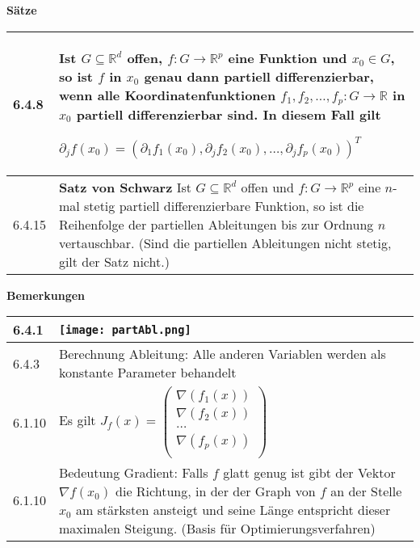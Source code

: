     \noindent 
    \textbf{Sätze}
    \begin{table}[H]
    \begin{tabularx}{\textwidth}{X m{16cm}}
        \toprule

        6.4.8 & Ist $G \subseteq \mathbb{R}^d$ offen, $f: G \rightarrow \mathbb{R}^p$ eine Funktion und $x_0 \in G$, so ist $f$ in $x_0$
                genau dann partiell differenzierbar, wenn alle Koordinatenfunktionen $f_1, f_2, \dots, f_p : G\rightarrow \mathbb{R}$ in $x_0$
                partiell differenzierbar sind. In diesem Fall gilt \hfill \break
                \centerline{$ \partial_j f(x_0) = (\partial_1 f_1(x_0), \partial_j f_2(x_0), \dots, \partial_j f_p(x_0) )^T$} \\
        \midrule
        6.4.15& \textbf{Satz von Schwarz} \hfill \break
                Ist $G \subseteq \mathbb{R}^d$ offen und $f: G \rightarrow \mathbb{R}^p$ eine $n$-mal stetig partiell differenzierbare Funktion,
                so ist die Reihenfolge der partiellen Ableitungen bis zur Ordnung $n$ vertauschbar. \hfill \break
                (Sind die partiellen Ableitungen nicht stetig, gilt der Satz nicht.)\\ 

        \bottomrule
    \end{tabularx}
    \end{table}

    \pagebreak

    \noindent
    \textbf{Bemerkungen}
    \begin{table}[H]
    \begin{tabularx}{\textwidth}{X m{16cm}}
        \toprule

        6.4.1 & \texttt{[image: partAbl.png]} \\
        \midrule
        6.4.3 & Berechnung Ableitung: Alle anderen Variablen werden als konstante Parameter behandelt \\
        \midrule
        6.1.10& Es gilt $J_f(x)=    \begin{pmatrix}
                                    \nabla(f_1(x)) \\
                                    \nabla(f_2(x)) \\
                                    \dots \\
                                    \nabla(f_p(x)) \\
                                    \end{pmatrix}$ \\
        \midrule
        6.1.10& Bedeutung Gradient: Falls $f$ glatt genug ist gibt der Vektor $\nabla f(x_0)$ die Richtung, in der der Graph von $f$ an der Stelle
                $x_0$ am stärksten ansteigt und seine Länge entspricht dieser maximalen Steigung. (Basis für Optimierungsverfahren) \\

        \bottomrule
    \end{tabularx}
    \end{table}

